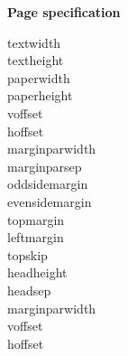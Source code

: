 \documentclass[11pt,twoside]{../Filofax-Template/filofax2}
\begin{document}
\begin{ffpage}{\Large \bf Page specification}

textwidth \the\textwidth\\
textheight \the\textheight\\
paperwidth \the\paperwidth\\
paperheight \the\paperheight\\

voffset \the\voffset \\ 
hoffset \the\hoffset \\

marginparwidth \the \marginparwidth \\
marginparsep \the \marginparsep \\

oddsidemargin \the\oddsidemargin  \\
evensidemargin \the\evensidemargin \\


topmargin \the\topmargin \\
leftmargin \the\leftmargin \\
topskip \the\topskip \\
headheight \the\headheight \\
headsep \the\headsep \\
marginparwidth \the\marginparwidth \\

voffset \the\voffset \\
hoffset \the\hoffset \\




\end{ffpage}
\end{document}
